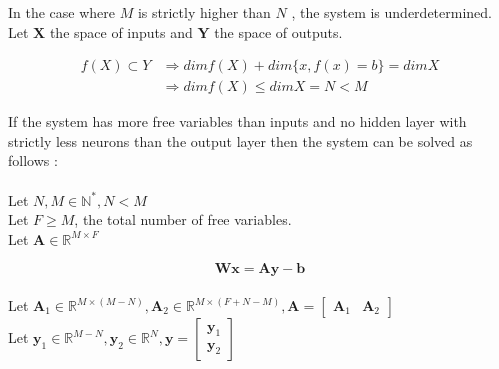 \documentclass{article}
\begin{document}
In the case where $M$ is strictly higher than $N$ , the system is underdetermined.\\
Let $\mathbf{X}$ the space of inputs and $\mathbf{Y}$ the space of outputs.

\begin{equation*}
    \begin{split}
    f(X) \subset Y & \Rightarrow dim f(X) + dim \{x, f(x) = b\}  = dim X \\
    & \Rightarrow dim f(X) \leq dim X = N <  M
    \end{split}
\end{equation*}

If the system has more free variables than inputs and no hidden layer 
with strictly less neurons than the output layer then the system can be solved as follows :
\\
\\
Let $ N,M \in \mathbb{N^{*}},N<M$\\
Let $F \geq M$, the total number of free variables.
\\ Let $\textbf{A} \in \mathbb{R}^{M \times F}$


\begin{equation}
    \textbf{Wx}=\textbf{Ay}-\textbf{b}
\end{equation}
\\
Let $\textbf{A}_{1} \in \mathbb{R}^{M \times (M-N)},\textbf{A}_{2} \in \mathbb{R}^{M \times (F+N-M)}, 
\textbf{A} = \begin{bmatrix}\textbf{A}_{1}&\textbf{A}_{2} \end{bmatrix}$\\
Let $\textbf{y}_{1} \in \mathbb{R}^{M-N},\textbf{y}_{2} \in \mathbb{R}^{N},
\textbf{y} = \begin{bmatrix}\textbf{y}_{1} \\ \textbf{y}_{2} \end{bmatrix}$
\end{document}
